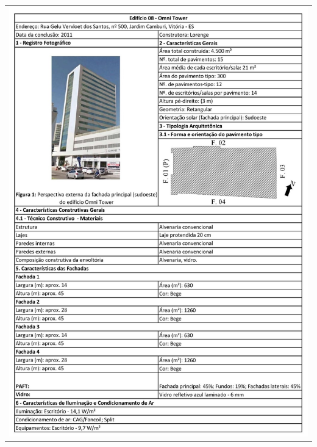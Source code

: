 \begin{table}[H]
    \centering
    \begin{tabular}{l}
        \includegraphics[width=\textwidth]{figures/appendices/edificio08.jpg}
    \end{tabular}
\end{table}
\pagebreak
